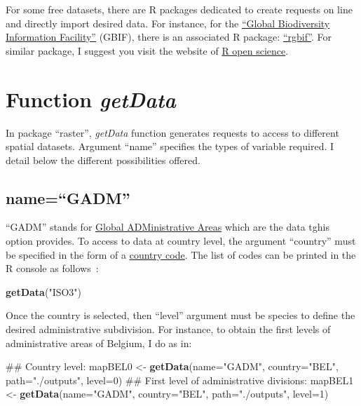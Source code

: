 \documentclass[]{report}
\newenvironment{Shaded}{\begin{snugshade}}{\end{snugshade}}
\newcommand{\DataTypeTok}[1]{\textcolor[rgb]{0.13,0.29,0.53}{#1}}
\newcommand{\DecValTok}[1]{\textcolor[rgb]{0.00,0.00,0.81}{#1}}
\newcommand{\KeywordTok}[1]{\textcolor[rgb]{0.13,0.29,0.53}{\textbf{#1}}}
\newcommand{\NormalTok}[1]{#1}
\newcommand{\StringTok}[1]{\textcolor[rgb]{0.31,0.60,0.02}{#1}}
\begin{document}
For some free datasets, there are R packages dedicated to create
requests on line and directly import desired data. For instance, for the
\href{\%22http://www.gbif.org\%22}{``Global Biodiversity Information
Facility''} (GBIF), there is an associated R package:
\href{http://cran.r-project.org/web/packages/rgbif/index.html}{``rgbif''}.
For similar package, I suggest you visit the website of
\href{https://ropensci.org/packages/}{R open science}.

\hypertarget{function-getdata}{%
\section{\texorpdfstring{Function
\emph{getData}}{Function getData}}\label{function-getdata}}

In package ``raster'', \emph{getData} function generates requests to
access to different spatial datasets. Argument ``name'' specifies the
types of variable required. I detail below the different possibilities
offered.

\hypertarget{namegadm}{%
\subsection{name=``GADM''}\label{namegadm}}

``GADM'' stands for \href{http://www.gadm.org}{Global ADMinistrative
Areas} which are the data tghis option provides. To access to data at
country level, the argument ``country'' must be specified in the form of
a \href{https://en.wikipedia.org/wiki/ISO_3166-1_alpha-3}{country code}.
The list of codes can be printed in the R console as follows~:

\begin{Shaded}
\begin{Highlighting}[]
\KeywordTok{getData}\NormalTok{(}\StringTok{"ISO3"}\NormalTok{)}
\end{Highlighting}
\end{Shaded}

Once the country is selected, then ``level'' argument must be species to
define the desired administrative subdivision. For instance, to obtain
the first levels of administrative areas of Belgium, I do as in:

\begin{Shaded}
\begin{Highlighting}[]
\NormalTok{## Country level:}
\NormalTok{mapBEL0 <-}\StringTok{ }\KeywordTok{getData}\NormalTok{(}\DataTypeTok{name=}\StringTok{"GADM"}\NormalTok{, }\DataTypeTok{country=}\StringTok{"BEL"}\NormalTok{, }\DataTypeTok{path=}\StringTok{"./outputs"}\NormalTok{, }\DataTypeTok{level=}\DecValTok{0}\NormalTok{)}
\NormalTok{## First level of administrative divisions:}
\NormalTok{mapBEL1 <-}\StringTok{ }\KeywordTok{getData}\NormalTok{(}\DataTypeTok{name=}\StringTok{"GADM"}\NormalTok{, }\DataTypeTok{country=}\StringTok{"BEL"}\NormalTok{, }\DataTypeTok{path=}\StringTok{"./outputs"}\NormalTok{, }\DataTypeTok{level=}\DecValTok{1}\NormalTok{)}
\end{Highlighting}
\end{Shaded}
\end{document}
